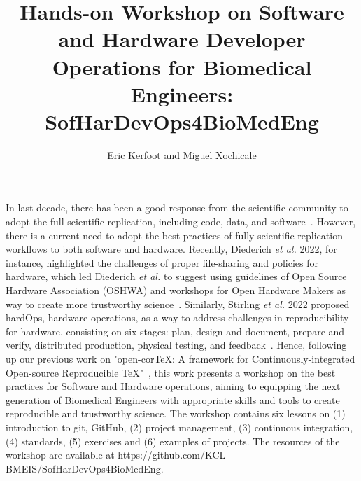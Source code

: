 \documentclass{article}
\title{
Hands-on Workshop on Software and Hardware Developer Operations for Biomedical Engineers: SofHarDevOps4BioMedEng %
}
\author{
Eric Kerfoot and Miguel Xochicale
}
\date{\DTMNow}
\begin{document}
\maketitle
In last decade, there has been a good response from the scientific community to adopt the full scientific replication, including code, data, and software~\cite{peng2011}. 
However, there is a current need to adopt the best practices of fully scientific replication workflows to both software and hardware.
Recently, Diederich \textit{et al.} 2022, for instance, highlighted the challenges of proper file-sharing and policies for hardware, which led Diederich \textit{et al.} to suggest using guidelines of Open Source Hardware Association (OSHWA) and workshops for Open Hardware Makers as way to create more trustworthy science~\cite{Diederich2022}.
Similarly, Stirling \textit{et al.} 2022 proposed hardOps, hardware operations, as a way to address challenges in reproducibility for hardware, consisting on six stages: plan, design and document, prepare and verify, distributed production, physical testing, and feedback~\cite{stirling2022}. 
Hence, following up our previous work on "open-corTeX: A framework for Continuously-integrated Open-source Reproducible TeX"~\cite{xochicale2020}, this work presents a workshop on the best practices for Software and Hardware operations, aiming to equipping the next generation of Biomedical Engineers with appropriate skills and tools to create reproducible and trustworthy science.
The workshop contains six lessons on (1) introduction to git, GitHub, (2) project management, (3) continuous integration, (4) standards, (5) exercises and (6) examples of projects.
The resources of the workshop are available at https://github.com/KCL-BMEIS/SofHarDevOps4BioMedEng.

\newpage
%

\end{document}
